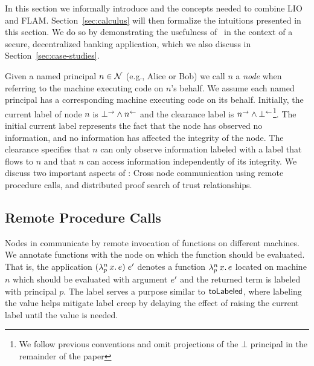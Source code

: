 In this section we informally introduce \lang{} and the concepts needed to combine LIO and FLAM. Section~\ref{sec:calculus} will then formalize the intuitions presented in this section. We do so by demonstrating the usefulness of \lang{}\ in the context of a secure, decentralized banking application, which we also discuss in Section~\ref{sec:case-studies}.

Given a named principal $n \in \mathcal{N}$ (e.g., Alice or Bob) we call $n$ a \emph{node} when referring to the machine executing code on $n$'s behalf. We assume each named principal has a corresponding machine executing code on its behalf. Initially, the current label of node $n$ is $\bot^{\rightarrow} \wedge n^{\leftarrow}$ and the clearance label is $n^{\rightarrow} \wedge \bot^{\leftarrow}$\footnote{We follow previous conventions \cite{Arden:2015:FA:2859845.2859998} and omit projections of the $\bot$ principal in the remainder of the paper}. The initial current label represents the fact that the node has observed no information, and no information has affected the integrity of the node. The clearance specifies that $n$ can only observe information labeled with a label that flows to $n$ and that $n$ can access information independently of its integrity.  We discuss two important aspects of \lang: Cross node communication using remote procedure calls, and distributed proof search of trust relationships.

\subsection{Remote Procedure Calls}
Nodes in \lang{} communicate by remote invocation of functions on different machines. We annotate functions with the node on which the function should be evaluated. That is, the application $(\lambda^{n}_{p}\,x.\,e)\;e'$ denotes a function $\lambda^{n}_{p}\,x.\,e$ located on machine $n$ which should be evaluated with argument $e'$ and the returned term is labeled with principal $p$. The label serves a purpose similar to $\mathsf{toLabeled}$, where labeling the value helps mitigate label creep by delaying the effect of raising the current label until the value is needed.

